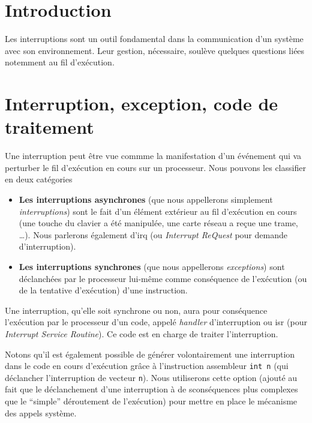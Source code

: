 %      
\section{Introduction}

   Les interruptions sont un outil fondamental dans la communication
d'un système avec son environnement. Leur gestion, nécessaire, soulève
quelques questions liées notemment au fil d'exécution.

%      
\section{Interruption, exception, code de traitement}

   Une interruption peut être vue commme la manifestation d'un
événement qui va perturber le fil d'exécution en cours sur un
processeur. Nous pouvons les classifier en deux catégories

\begin{itemize}
   \item {\bf Les interruptions asynchrones} (que nous appellerons
     simplement {\em interruptions}) sont le fait d'un élément
     extérieur au fil d'exécution en cours (une touche du clavier a
     été manipulée, une carte réseau a reçue une trame, \ldots). Nous
     parlerons également d'{\sc irq} (ou {\em Interrupt ReQuest} pour
     demande d'interruption).
   \item {\bf Les interruptions synchrones} (que nous appellerons {\em
     exceptions}) sont déclanchées par le processeur lui-même comme
     conséquence de l'exécution (ou de la tentative d'exécution) d'une
     instruction. 
\end{itemize}

   Une interruption, qu'elle soit synchrone ou non, aura pour
conséquence l'exécution par le processeur d'un code, appelé
{\em handler} d'interruption ou {\sc isr} (pour {\em Interrupt Service
  Routine}). Ce code est en charge de traiter l'interruption.

   Notons qu'il est également possible de générer volontairement une
interruption dans le code en cours d'exécution grâce à
l'instruction assembleur \lstinline!int n! (qui déclancher
l'interruption de vecteur \lstinline!n!). Nous utiliserons cette
option (ajouté au fait que le déclanchement d'une interruption à de
sconséquences plus complexes que le ``simple'' déroutement de
l'exécution) pour mettre en place le mécanisme des appels système.

